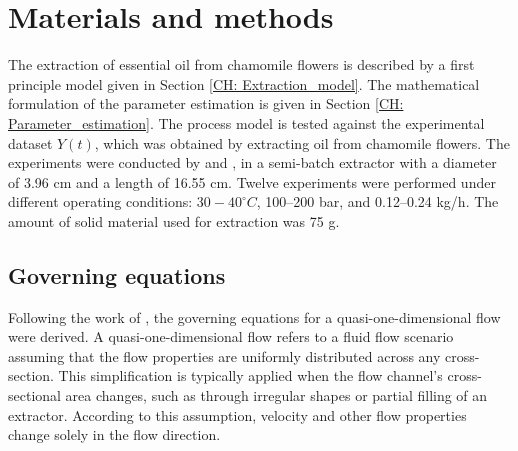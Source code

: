 \documentclass[a4paper,fleqn]{cas-dc}
\begin{document}
	
	
	\section{Materials and methods} \label{CH: Materials and methods}
	
	The extraction of essential oil from chamomile flowers is described by a first principle model given in Section \ref{CH: Extraction_model}. The mathematical formulation of the parameter estimation is given in Section \ref{CH: Parameter_estimation}. The process model is tested against the experimental dataset $Y(t)$, which was obtained by extracting oil from chamomile flowers. The experiments were conducted by \citet{Povh2001} and \citet{Rahimi2011}, in a semi-batch extractor with a diameter of 3.96 cm and a length of 16.55 cm. Twelve experiments were performed under different operating conditions: $30-40^\circ C$, 100--200 bar, and 0.12--0.24 kg/h. The amount of solid material used for extraction was 75 g.
	
	\subsection{Governing equations} \label{CH:Governing_equations_chapter}
	Following the work of \citet{Anderson1995}, the governing equations for a quasi-one-dimensional flow were derived. A quasi-one-dimensional flow refers to a fluid flow scenario assuming that the flow properties are uniformly distributed across any cross-section. This simplification is typically applied when the flow channel's cross-sectional area changes, such as through irregular shapes or partial filling of an extractor. According to this assumption, velocity and other flow properties change solely in the flow direction.
	
\end{document}
